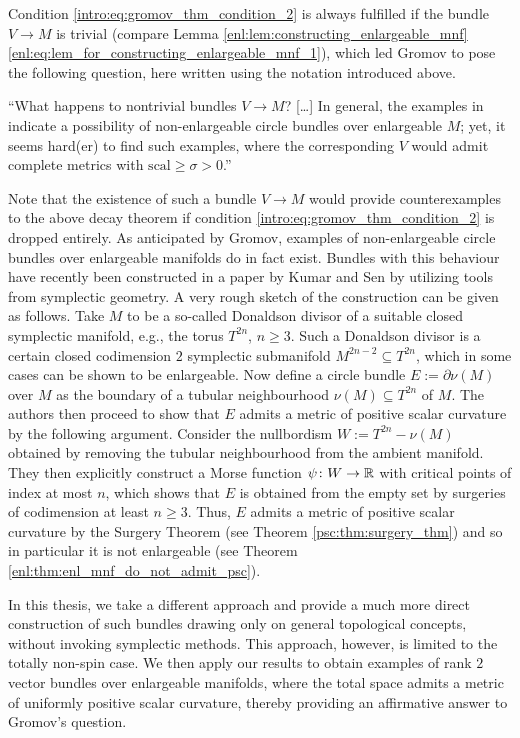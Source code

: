 Condition \ref{intro:eq:gromov_thm_condition_2} is always fulfilled if the bundle $V \to M$ is trivial (compare Lemma \ref{enl:lem:constructing_enlargeable_mnf} \ref{enl:eq:lem_for_constructing_enlargeable_mnf_1}), which led Gromov to pose the following question, here written using the notation introduced above.

\begin{question*}
``What happens to nontrivial bundles $V \to M$? [\dots] In general, the examples in \cite{BrunnbauerHanke} indicate a possibility of non-enlargeable circle bundles over enlargeable $M$; yet, it seems hard(er) to find such examples, where the corresponding $V$ would admit complete metrics with $\mathrm{scal} \geq \sigma > 0$.''
\end{question*}


Note that the existence of such a bundle $V \to M$ would provide counterexamples to the above decay theorem if condition \ref{intro:eq:gromov_thm_condition_2} is dropped entirely. As anticipated by Gromov, examples of non-enlargeable circle bundles over enlargeable manifolds do in fact exist. Bundles with this behaviour have recently been constructed in a paper by Kumar and Sen \cite{kumar2025circle} by utilizing tools from symplectic geometry. A very rough sketch of the construction can be given as follows. Take $M$ to be a so-called Donaldson divisor of a suitable closed symplectic manifold, e.g., the torus $T^{2n}$, $n \geq 3$. Such a Donaldson divisor is a certain closed codimension $2$ symplectic submanifold $M^{2n-2} \subseteq T^{2n}$, which in some cases can be shown to be enlargeable. Now define a circle bundle $E := \partial \nu(M)$ over $M$ as the boundary of a tubular neighbourhood $\nu(M) \subseteq T^{2n}$ of $M$. The authors then proceed to show that $E$ admits a metric of positive scalar curvature by the following argument. Consider the nullbordism $W := T^{2n} - \nu(M)$ obtained by removing the tubular neighbourhood from the ambient manifold. They then explicitly construct a Morse function $\psi \colon W \to \mathbb{R}$ with critical points of index at most $n$, which shows that $E$ is obtained from the empty set by surgeries of codimension at least $n \geq 3$. Thus, $E$ admits a metric of positive scalar curvature by the Surgery Theorem (see Theorem \ref{psc:thm:surgery_thm}) and so in particular it is not enlargeable (see Theorem \ref{enl:thm:enl_mnf_do_not_admit_psc}).

In this thesis, we take a different approach and provide a much more direct construction of such bundles drawing only on general topological concepts, without invoking symplectic methods. This approach, however, is limited to the totally non-spin case. We then apply our results to obtain examples of rank $2$ vector bundles over enlargeable manifolds, where the total space admits a metric of uniformly positive scalar curvature, thereby providing an affirmative answer to Gromov's question.

